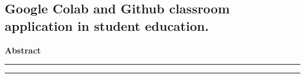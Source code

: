 \documentclass[a4paper,12pt]{article}
\begin{document}


\begin{large}

\begin{center}
\section*{Google Colab and Github classroom application in student education.}
\end{center}

\medskip

\begin{center}
\textbf{Abstract}
\end{center}


\hrule height 1pt
\vskip 3pt \hrule

\medskip
\medskip






\end{large}
\end{document}
